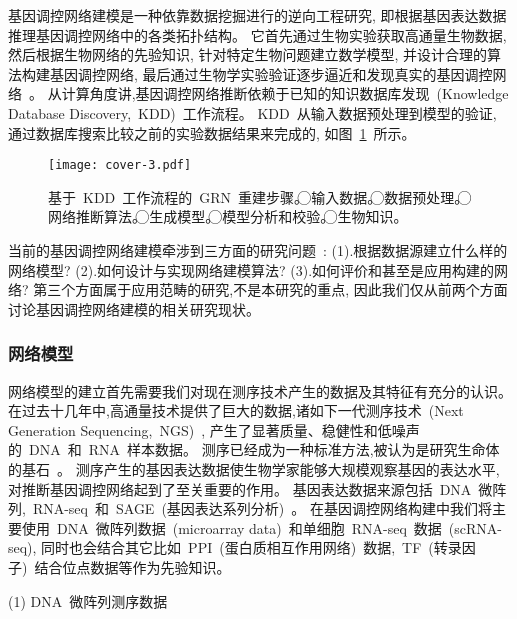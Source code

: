 基因调控网络建模是一种依靠数据挖掘进行的逆向工程研究, 即根据基因表达数据推理基因调控网络中的各类拓扑结构。
它首先通过生物实验获取高通量生物数据, 然后根据生物网络的先验知识, 针对特定生物问题建立数学模型, 
并设计合理的算法构建基因调控网络, 最后通过生物学实验验证逐步逼近和发现真实的基因调控网络~\cite{sima2009inference}。
从计算角度讲,基因调控网络推断依赖于已知的知识数据库发现~(Knowledge Database Discovery,~KDD)~工作流程。
KDD~从输入数据预处理到模型的验证, 通过数据库搜索比较之前的实验数据结果来完成的, 如图~\ref{cover-3}~所示。
\begin{figure}[!htbp]
    \centering
    \texttt{[image: cover-3.pdf]}
    \caption{基于~KDD~工作流程的~GRN~重建步骤。
    \textcircled{\raisebox{-0.9pt}{1}}输入数据。
    \textcircled{\raisebox{-0.9pt}{2}}数据预处理。
    \textcircled{\raisebox{-0.9pt}{3}}网络推断算法。
    \textcircled{\raisebox{-0.9pt}{4}}生成模型。
    \textcircled{\raisebox{-0.9pt}{5}}模型分析和校验。
    \textcircled{\raisebox{-0.9pt}{6}}生物知识。
    }
    \label{cover-3}
\end{figure}

当前的基因调控网络建模牵涉到三方面的研究问题~\cite{schlitt2007current}:
(1).根据数据源建立什么样的网络模型?
(2).如何设计与实现网络建模算法?
(3).如何评价和甚至是应用构建的网络?
第三个方面属于应用范畴的研究,不是本研究的重点, 因此我们仅从前两个方面讨论基因调控网络建模的相关研究现状。

\subsubsection{网络模型}

网络模型的建立首先需要我们对现在测序技术产生的数据及其特征有充分的认识。
在过去十几年中,高通量技术提供了巨大的数据,诸如下一代测序技术~(Next Generation Sequencing,~NGS)~\cite{BUERMANS20141932}, 
产生了显著质量、稳健性和低噪声的~DNA~和~RNA~样本数据。
测序已经成为一种标准方法,被认为是研究生命体的基石~\cite{CEREB2015923}。
测序产生的基因表达数据使生物学家能够大规模观察基因的表达水平, 对推断基因调控网络起到了至关重要的作用。
基因表达数据来源包括~DNA~微阵列,~RNA-seq~\cite{morin2008profiling}和~SAGE~(基因表达系列分析)~\cite{velculescu1995serial}。
在基因调控网络构建中我们将主要使用~DNA~微阵列数据~(microarray data)~和单细胞~RNA-seq~数据~(scRNA-seq),
同时也会结合其它比如~PPI~(蛋白质相互作用网络)~数据,~TF~(转录因子)~结合位点数据等作为先验知识。

(1) DNA~微阵列测序数据


